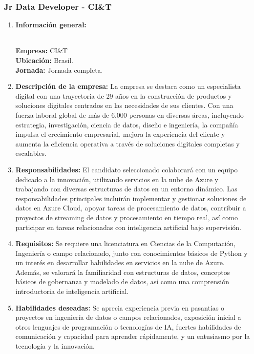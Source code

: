 \documentclass[12pt]{article}
\begin{document}
            \subsubsection{Jr Data Developer -  CI\&T}
                \begin{enumerate}
                    \item \textbf{Información general:}
                    
                        \textbf{\\Empresa:} CI\&T
                        \textbf{\\Ubicación:} Brasil.
                        \textbf{\\Jornada:} Jornada completa.

                    \item \textbf{Descripción de la empresa:} 
                        La empresa se destaca como un especialista digital con una trayectoria de 29 años en la construcción de productos y soluciones digitales centrados en las necesidades de sus clientes. Con una fuerza laboral global de más de 6.000 personas en diversas áreas, incluyendo estrategia, investigación, ciencia de datos, diseño e ingeniería, la compañía impulsa el crecimiento empresarial, mejora la experiencia del cliente y aumenta la eficiencia operativa a través de soluciones digitales completas y escalables.

                    \item \textbf{Responsabilidades:}
                        El candidato seleccionado colaborará con un equipo dedicado a la innovación, utilizando servicios en la nube de Azure y trabajando con diversas estructuras de datos en un entorno dinámico. Las responsabilidades principales incluirán implementar y gestionar soluciones de datos en Azure Cloud, apoyar tareas de procesamiento de datos, contribuir a proyectos de streaming de datos y procesamiento en tiempo real, así como participar en tareas relacionadas con inteligencia artificial bajo supervisión.

                    \item \textbf{Requisitos:}
                        Se requiere una licenciatura en Ciencias de la Computación, Ingeniería o campo relacionado, junto con conocimientos básicos de Python y un interés en desarrollar habilidades en servicios en la nube de Azure. Además, se valorará la familiaridad con estructuras de datos, conceptos básicos de gobernanza y modelado de datos, así como una comprensión introductoria de inteligencia artificial.

                    \item \textbf{Habilidades deseadas:}
                        Se aprecia experiencia previa en pasantías o proyectos en ingeniería de datos o campos relacionados, exposición inicial a otros lenguajes de programación o tecnologías de IA, fuertes habilidades de comunicación y capacidad para aprender rápidamente, y un entusiasmo por la tecnología y la innovación.

                \end{enumerate}
\end{document}
